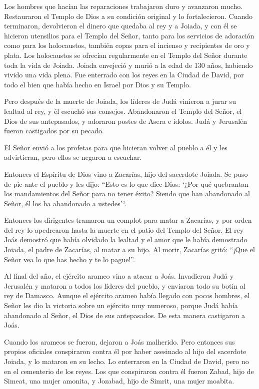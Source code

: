  Los hombres que hacían las reparaciones trabajaron duro y
avanzaron mucho. Restauraron el Templo de Dios a su condición original y
lo fortalecieron.  Cuando terminaron, devolvieron el dinero
que quedaba al rey y a Joiada, y con él se hicieron utensilios para el
Templo del Señor, tanto para los servicios de adoración como para los
holocaustos, también copas para el incienso y recipientes de oro y
plata. Los holocaustos se ofrecían regularmente en el Templo del Señor
durante toda la vida de Joiada.  Joiada envejeció y murió a
la edad de 130 años, habiendo vivido una vida plena.  Fue
enterrado con los reyes en la Ciudad de David, por todo el bien que
había hecho en Israel por Dios y su Templo.

 Pero después de la muerte de Joiada, los líderes de Judá
vinieron a jurar su lealtad al rey, y él escuchó sus consejos.
 Abandonaron el Templo del Señor, el Dios de sus
antepasados, y adoraron postes de Asera e ídolos. Judá y Jerusalén
fueron castigados por su pecado.

 El Señor envió a los profetas para que hicieran volver al
pueblo a él y les advirtieran, pero ellos se negaron a escuchar.

 Entonces el Espíritu de Dios vino a Zacarías, hijo del
sacerdote Joiada. Se puso de pie ante el pueblo y les dijo: ``Esto es lo
que dice Dios: `¿Por qué quebrantan los mandamientos del Señor para no
tener éxito? Siendo que han abandonado al Señor, él los ha abandonado a
ustedes'``.

 Entonces los dirigentes tramaron un complot para matar a
Zacarías, y por orden del rey lo apedrearon hasta la muerte en el patio
del Templo del Señor.  El rey Joás demostró que había
olvidado la lealtad y el amor que le había demostrado Joiada, el padre
de Zacarías, al matar a su hijo. Al morir, Zacarías gritó: ``¡Que el
Señor vea lo que has hecho y te lo pague!''.

 Al final del año, el ejército arameo vino a atacar a Joás.
Invadieron Judá y Jerusalén y mataron a todos los líderes del pueblo, y
enviaron todo su botín al rey de Damasco.  Aunque el
ejército arameo había llegado con pocos hombres, el Señor les dio la
victoria sobre un ejército muy numeroso, porque Judá había abandonado al
Señor, el Dios de sus antepasados. De esta manera castigaron a Joás.

 Cuando los arameos se fueron, dejaron a Joás malherido.
Pero entonces sus propios oficiales conspiraron contra él por haber
asesinado al hijo del sacerdote Joiada, y lo mataron en su lecho. Lo
enterraron en la Ciudad de David, pero no en el cementerio de los reyes.
 Los que conspiraron contra él fueron Zabad, hijo de
Simeat, una mujer amonita, y Jozabad, hijo de Simrit, una mujer moabita.

